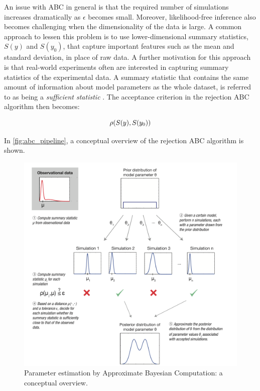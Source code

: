 An issue with ABC in general is that the required number of simulations increases dramatically as $\epsilon$ becomes small. Moreover, likelihood-free inference also becomes challenging when the dimensionality of the data is large. A common approach to lessen this problem is to use lower-dimensional summary statistics, $S(y)$ and $S(y_0)$, that capture important features such as the mean and standard deviation, in place of raw data. %
A further motivation for this approach is that real-world experiments often are interested in capturing summary statistics of the experimental data. A summary statistic that contains the same amount of information about model parameters as the whole dataset, is referred to as being a \textit{sufficient statistic} \cite{ABCprimer}. The acceptance criterion in the rejection ABC algorithm then becomes:

\begin{equation}
    \rho \qty(S(y), S(y_0))
\end{equation}

In \autoref{fig:abc_pipeline}, a conceptual overview of the rejection ABC algorithm is shown. 

\begin{figure}[H]
    \centering 
    \includegraphics[scale=0.7]{./3_Images/abc_pipeline.png}
    \caption{Parameter estimation by Approximate Bayesian Computation: a conceptual overview.}
    \label{fig:abc_pipeline}
\end{figure}


